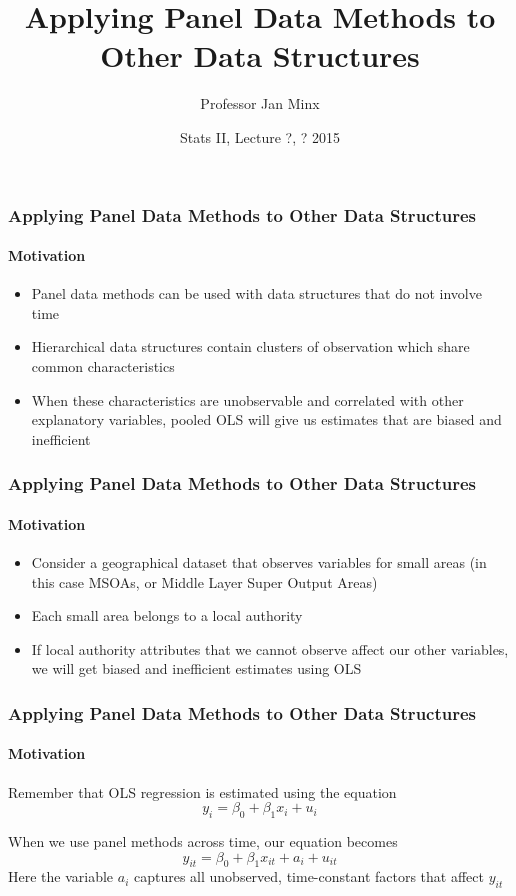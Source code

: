 \documentclass{beamer}
\title 
{Applying Panel Data Methods to Other Data Structures}
\author
{Professor Jan Minx}
\institute
{Hertie School of Governance}
\date
{Stats II, Lecture ?, ? 2015}
\begin{document}
  \frame{\titlepage}

  \begin{frame}
    \frametitle{Applying Panel Data Methods to Other Data Structures}
    \framesubtitle{Motivation}
    \begin{itemize}
      \item Panel data methods can be used with data structures that do not involve time
      \item Hierarchical data structures contain clusters of observation which share common characteristics
      \item When these characteristics are unobservable and correlated with other explanatory variables, pooled OLS will give us estimates that are biased and inefficient
    \end{itemize}
  \end{frame}
  
  \begin{frame}
    \frametitle{Applying Panel Data Methods to Other Data Structures}
    \framesubtitle{Motivation}
    \begin{itemize}
      \item Consider a geographical dataset that observes variables for small areas (in this case MSOAs, 
      or Middle Layer Super Output Areas)
      \item Each small area belongs to a local authority
      \item If local authority attributes that we cannot observe affect our other variables, we will get biased and inefficient estimates using OLS
    \end{itemize}
  \end{frame}
  
  \begin{frame}
    \frametitle{Applying Panel Data Methods to Other Data Structures}
    \framesubtitle{Motivation}
    Remember that OLS regression is estimated using the equation
    $$ y_{i} = \beta_{0} + \beta_{1}x_{i} + u_{i} $$
    
    When we use panel methods across time, our equation becomes
    $$ y_{it} = \beta_{0} + \beta_{1}x_{it} + a_{i} + u_{it} $$
    Here the variable $a_{i}$ captures all unobserved, time-constant factors that affect $y_{it}$
  \end{frame}
    
\end{document}
